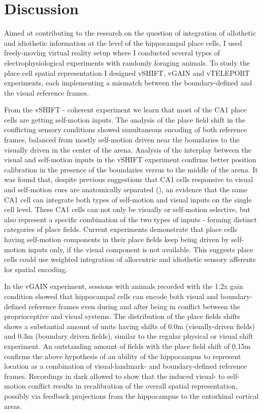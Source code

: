 \chapter{Discussion}
\label{ch:discussion}

Aimed at contributing to the research on the question of integration of allothetic and idiothetic information at the level of the hippocampal place cells, I used freely-moving virtual reality setup where I conducted several types of electrophysiological experiments with randomly foraging animals. To study the place cell spatial representation I designed vSHIFT, vGAIN and vTELEPORT experiments, each implementing a mismatch between the boundary-defined and the visual reference frames.

From the vSHIFT - coherent experiment we learn that most of the CA1 place cells are getting self-motion inputs. The analysis of the place field shift in the conflicting sensory conditions showed simultaneous encoding of both reference frames, balanced from mostly self-motion driven near the boundaries to the visually driven in the center of the arena. Analysis of the interplay between the visual and self-motion inputs in the vSHIFT experiment confirms better position calibration in the presence of the boundaries versus to the middle of the arena. It was found that, despite previous suggestions that CA1 cells responsive to visual and self-motion cues are anatomically separated (\cite{Fattahi2018}), an evidence that the same CA1 cell can integrate both types of self-motion and visual inputs on the single cell level. These CA1 cells can not only be visually or self-motion selective, but also represent a specific combination of the two types of inputs - forming distinct categories of place fields. Current experiments demonstrate that place cells having self-motion components in their place fields keep being driven by self-motion inputs only, if the visual component is not available. This suggests place cells could use weighted integration of allocentric and idiothetic sensory afferents for spatial encoding.

In the vGAIN experiment, sessions with animals recorded with the 1.2x gain condition showed that hippocampal cells can encode both visual and boundary-defined reference frames even during and after being in conflict between the proprioceptive and visual systems. The distribution of the place fields shifts shows a substantial amount of units having shifts of 0.0m (visually-driven fields) and 0.3m (boundary driven fields), similar to the regular physical or visual shift experiment. An outstanding amount of fields with the place field shift of 0.15m confirms the above hypothesis of an ability of the hippocampus to represent location as a combination of visual-landmark- and boundary-defined reference frames. Recordings in dark allowed to show that the induced visual- to self-motion conflict results in recalibration of the overall spatial representation, possibly via feedback projections from the hippocampus to the entorhinal cortical areas.

